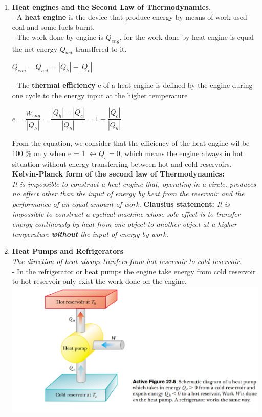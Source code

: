 \documentclass[10pt]{article}
\begin{document}
\begin{enumerate}
	\item \textbf{Heat engines and the Second Law of Thermodynamics}.\\
	- A \textbf{heat engine} is the device that produce energy by means of work used coal and some fuels burnt.\\
	- The work done by engine is $Q_{eng}$, for the work done by heat engine is equal the net energy $Q_{net}$ transffered to it.
	\begin{mybox}
	\begin{center}
	$Q_{eng} = Q_{net} = |Q_h| - |Q_c|$
	\end{center}
	\end{mybox}
	- The \textbf{thermal efficiency} e of a heat engine is defined by the engine during one cycle to the energy input at the higher temperature
	\begin{mybox}
	\begin{center}
	$e = \dfrac{W_{eng}}{|Q_h|} = \dfrac{|Q_h| - |Q_c|}{|Q_h|} = 1 - \dfrac{|Q_c|}{|Q_h|}$
	\end{center}
	\end{mybox}
	From the equation, we consider that the efficiency of the heat engine wil be 100 \% only when e = 1 $\leftrightarrow{Q_c = 0}$, which means the engine always in hot situation without energy transferring between hot and cold reservoirs.\\
	\textbf{Kelvin-Planck form of the second law of Thermodynamics:}\\
	     \textit{It is impossible to construct a heat engine that, operating in a circle, produces no effect other than the input of energy by heat from the reservoir and the performance of an equal amount of work.}
	\textbf{Clausius statement:}
	     \textit{It is impossible to construct a cyclical machine whose sole effect is to transfer energy continously by heat from one object to another object at a higher temperature \textbf{without} the input of energy by work.}      
	\item \textbf{Heat Pumps and Refrigerators}\\
	\textit{The direction of heat always tranfers from hot reservoir to cold reservoir}.\\
	- In the refrigerator or heat pumps the engine take energy from cold reservoir to hot reservoir only exist the work done on the engine.\\
	\includegraphics[scale=0.7]{hinh3}\\

\end{enumerate}
\end{document}
